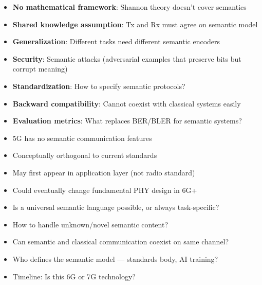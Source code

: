 \begin{itemize}
\tightlist
\item
  \textbf{No mathematical framework}: Shannon theory doesn’t cover semantics
\item
  \textbf{Shared knowledge assumption}: Tx and Rx must agree on semantic model
\item
  \textbf{Generalization}: Different tasks need different semantic encoders
\item
  \textbf{Security}: Semantic attacks (adversarial examples that preserve bits but corrupt meaning)
\item
  \textbf{Standardization}: How to specify semantic protocols?
\item
  \textbf{Backward compatibility}: Cannot coexist with classical systems easily
\item
  \textbf{Evaluation metrics}: What replaces BER/\allowbreak{}BLER for semantic systems?
\end{itemize}


\begin{itemize}
\tightlist
\item
  5G has no semantic communication features
\item
  Conceptually orthogonal to current standards
\item
  May first appear in application layer (not radio standard)
\item
  Could eventually change fundamental PHY design in 6G+
\end{itemize}


\begin{itemize}
\tightlist
\item
  Is a universal semantic language possible, or always task-specific?
\item
  How to handle unknown/\allowbreak{}novel semantic content?
\item
  Can semantic and classical communication coexist on same channel?
\item
  Who defines the semantic model — standards body, AI training?
\item
  Timeline: Is this 6G or 7G technology?
\end{itemize}



\CNchained{}

